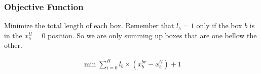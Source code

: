 \documentclass[12pt, a4paper]{article}
\begin{document}
\subsubsection{Objective Function}

Minimize the total length of each box. Remember that $l_b = 1$ only if the box $b$ is in the $x_b^{tl} = 0$ position. So we are only summing up boxes that are one bellow the other.

\begin{subequations}
  \begin{align}
    \min \sum_{i=0}^B l_b \times (x_b^{br} - x_b^{tl}) + 1
  \end{align}
\end{subequations}
\end{document}
